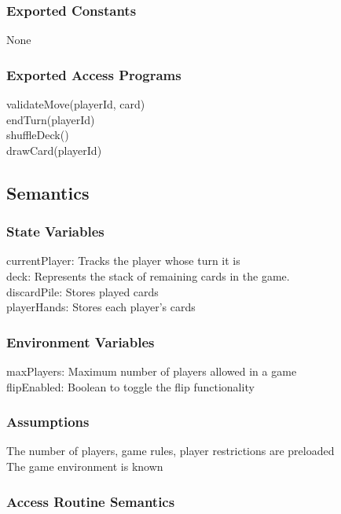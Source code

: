 \documentclass[12pt, titlepage]{article}
\begin{document}
\subsubsection{Exported Constants}
\hspace{1.5em}None

\subsubsection{Exported Access Programs}

\hspace{1.5em}validateMove(playerId, card)\\
\indent endTurn(playerId)\\
\indent shuffleDeck()\\
\indent drawCard(playerId)

\subsection{Semantics}

\subsubsection{State Variables}
\hspace{1.5em}currentPlayer: Tracks the player whose turn it is\\
\indent deck: Represents the stack of remaining cards in the game.\\
\indent discardPile: Stores played cards\\
\indent playerHands: Stores each player's cards

\subsubsection{Environment Variables}
\hspace{1.5em}maxPlayers: Maximum number of players allowed in a game\\
\indent flipEnabled: Boolean to toggle the flip functionality

\subsubsection{Assumptions}
\hspace{1.5em}The number of players, game rules, player restrictions are preloaded\\
\indent The game environment is known

\subsubsection{Access Routine Semantics}
\end{document}
